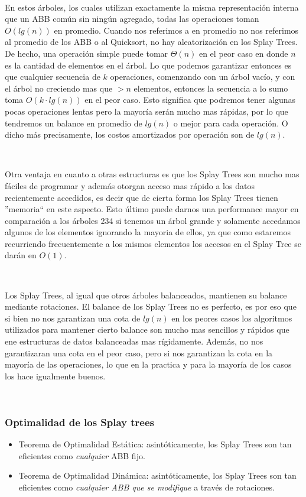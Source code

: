~

En estos \'arboles, los cuales utilizan exactamente la misma representaci\'on interna que un ABB com\'un sin ning\'un agregado, todas las operaciones toman $O(lg(n))$ en promedio. Cuando nos referimos a en promedio no nos referimos al promedio de los ABB o al Quicksort, no hay aleatorizaci\'on en los Splay Trees. De hecho, una operaci\'on simple puede tomar $\Theta(n)$ en el peor caso en donde $n$ es la cantidad de elementos en el \'arbol. Lo que podemos garantizar entonces es que cualquier secuencia de $k$ operaciones, comenzando con un \'arbol vac\'io, y con el \'arbol no creciendo mas que $>n$ elementos, entonces la secuencia a lo sumo toma $O(k\cdot lg(n))$ en el peor caso. Esto significa que podremos tener algunas pocas operaciones lentas pero la mayor\'ia ser\'an mucho mas r\'apidas, por lo que tendremos un balance en promedio de $lg(n)$ o mejor para cada operaci\'on. O dicho m\'as precisamente, los costos amortizados por operaci\'on son de $lg(n)$.

~

Otra ventaja en cuanto a otras estructuras es que los Splay Trees son mucho mas f\'aciles de programar y adem\'as otorgan acceso mas r\'apido a los datos recientemente accedidos, es decir que de cierta forma los Splay Trees tienen ''memoria`` en este aspecto. Esto \'ultimo puede darnos una performance mayor en comparaci\'on a los \'arboles 234 si tenemos un \'arbol grande y solamente accedamos algunos de los elementos ignorando la mayoria de ellos, ya que como estaremos recurriendo frecuentemente a los mismos elementos los accesos en el Splay Tree se dar\'an en $O(1)$.

~

Los Splay Trees, al igual que otros \'arboles balanceados, mantienen su balance mediante rotaciones. El balance de los Splay Trees no es perfecto, es por eso que si bien no nos garantizan una cota de $lg(n)$ en los peores casos los algoritmos utilizados para mantener cierto balance son mucho mas sencillos y r\'apidos que ene estructuras de datos balanceadas mas r\'igidamente. Adem\'as, no nos garantizaran una cota en el peor caso, pero si nos garantizan la cota en la mayor\'ia de las operaciones, lo que en la practica y para la mayor\'ia de los casos los hace igualmente buenos.

~

\subsubsection{Optimalidad de los Splay trees}
\begin{itemize}
 \item Teorema de Optimalidad Est\'atica: asint\'oticamente, los Splay Trees son tan eficientes como \textit{cualquier} ABB fijo.
 \item Teorema de Optimalidad Din\'amica: asint\'oticamente, los Splay Trees son tan eficientes como \textit{cualquier ABB que se modifique} a trav\'es de rotaciones.
\end{itemize}


